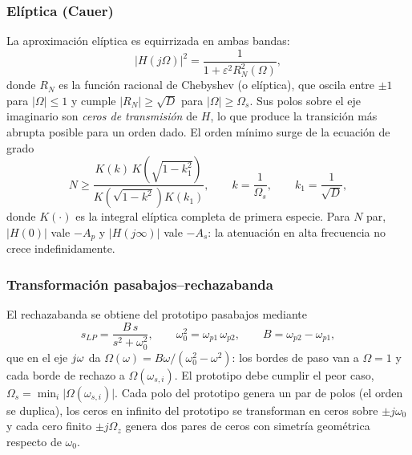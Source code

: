 \subsubsection{Elíptica (Cauer)}
La aproximación elíptica es equirrizada en ambas bandas:
\begin{equation}
  \lvert H(j\Omega)\rvert^2 = \frac{1}{1+\varepsilon^2 R_N^2(\Omega)},
  \label{eq:elip}
\end{equation}
donde $R_N$ es la función racional de Chebyshev (o elíptica), que oscila entre $\pm1$ para $\lvert\Omega\rvert\le1$ y cumple
$\lvert R_N\rvert \ge \sqrt{D}$ para $\lvert\Omega\rvert \ge \Omega_s$. Sus polos sobre el eje imaginario son \emph{ceros de transmisión}
de $H$, lo que produce la transición más abrupta posible para un orden dado. El orden mínimo surge de la ecuación de grado
\begin{equation}
  N \ge \frac{K(k)\,K\!\left(\sqrt{1-k_1^2}\right)}{K\!\left(\sqrt{1-k^2}\right)K(k_1)},\qquad k = \frac{1}{\Omega_s},\qquad k_1 = \frac{1}{\sqrt{D}},
  \label{eq:orden_elip}
\end{equation}
donde $K(\cdot)$ es la integral elíptica completa de primera especie. Para $N$ par, $\lvert H(0)\rvert$ vale $-A_p$ y
$\lvert H(j\infty)\rvert$ vale $-A_s$: la atenuación en alta frecuencia no crece indefinidamente.

\subsubsection{Transformación pasabajos--rechazabanda}
El rechazabanda se obtiene del prototipo pasabajos mediante
\begin{equation}
  s_{LP} = \frac{B\,s}{s^2+\omega_0^2},\qquad \omega_0^2 = \omega_{p1}\,\omega_{p2},\qquad B = \omega_{p2}-\omega_{p1},
  \label{eq:transf_bs}
\end{equation}
que en el eje $j\omega$ da $\Omega(\omega) = B\omega/(\omega_0^2-\omega^2)$: los bordes de paso van a $\Omega = 1$ y cada borde de rechazo a
$\Omega(\omega_{s,i})$. El prototipo debe cumplir el peor caso, $\Omega_s = \min_i \lvert\Omega(\omega_{s,i})\rvert$. Cada polo del prototipo
genera un par de polos (el orden se duplica), los ceros en infinito del prototipo se transforman en ceros sobre $\pm j\omega_0$ y cada cero
finito $\pm j\Omega_z$ genera dos pares de ceros con simetría geométrica respecto de $\omega_0$.

